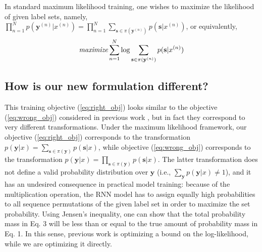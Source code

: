  
  In standard maximum likelihood training, one wishes to maximize the likelihood of given label sets, namely, $\prod_{n=1}^N p(\mathbf{y}^{(n)}|x^{(n)})=\prod_{n=1}^N \sum_{\mathbf{s}\in \pi(\mathbf{y}^{(n)})} p(\mathbf{s}|x^{(n)})$, or equivalently, 
\begin{align}
\textit{maximize} \sum_{n=1}^N \log \sum_{\mathbf{s}\in \pi(\mathbf{y}^{(n)})} p(\mathbf{s}|x^{(n)})
\label{eq:right_obj}
\end{align}




\subsection{How is our new formulation different?}

This training objective (\ref{eq:right_obj}) looks similar to the objective (\ref{eq:wrong_obj}) considered in previous work \cite{vinyals2015order}, but in fact they correspond to very different transformations. Under the maximum likelihood framework, our objective (\ref{eq:right_obj}) corresponds to the transformation $p(\mathbf{y}|x)=\sum_{\mathbf{s}\in \pi(\mathbf{y})} p(\mathbf{s}|x)$, while objective (\ref{eq:wrong_obj}) corresponds to the transformation $p(\mathbf{y}|x)=\prod_{\mathbf{s}\in \pi(\mathbf{y})} p(\mathbf{s}|x)$. The latter transformation does not define a valid probability distribution over $\mathbf{y}$ (i.e., $\sum_{\mathbf{y}} p(\mathbf{y}|x)\neq 1$), and it has an undesired  consequence in practical model training: because of the multiplication operation, the RNN model has to assign equally high probabilities to all sequence permutations of the given label set in order to maximize the set probability. 
Using Jensen’s inequality, one can show that the total probability mass in Eq. 3 will be less than or equal to the true amount of probability mass in Eq. 1. In this sense, previous work is optimizing a bound on the log-likelihood, while we are optimizing it directly. 

